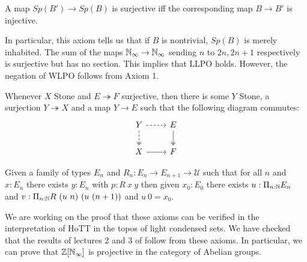 \begin{axiom}
  A map $Sp(B')\to Sp(B)$ is surjective iff the corresponding map $B \to B'$ is injective.
\end{axiom} 
In particular, this axiom tells us that if $B$ is nontrivial, 
$Sp(B)$ is merely inhabited.
%
%
The sum of the maps
$\mathbb{N}_{\infty} \to \mathbb{N}_{\infty}$
sending $n$ to $2n,2n+1$ respectively
is surjective but has no section. 
This implies that LLPO holds. 
However, the negation of WLPO follows from Axiom 1.  


\begin{axiom}
  Whenever $X$ Stone and $E\twoheadrightarrow F$ surjective, then there is some $Y$ Stone,
    a surjection $Y \twoheadrightarrow X$ and a map $Y\to E$ such that the following diagram commutes:
    \begin{equation*}\begin{tikzcd}
      Y \arrow [d, two heads,dashed] \arrow [r,dashed] & E \arrow[d,""',two heads]\\
      X \arrow[r] & F
    \end{tikzcd}\end{equation*}  
\end{axiom} 

\begin{axiom}
  Given a family of types $E_n$ and $R_n:E_n\rightarrow E_{n+1}\rightarrow {\mathcal U}$ such that
  for all $n$ and $x:E_n$ there exists $y:E_n$ with $p:R~x~y$ then given $x_0:E_0$ there exists
  $u:\Pi_{n:\mathbb{N}}E_n$ and $v:\Pi_{n:\mathbb{N}}R~(u~n)~(u~(n+1))$ and $u~0 = x_0$.
\end{axiom}

We are working on the proof that these axioms can be verified in the interpretation of HoTT in the topos of light condensed sets. We have checked that the results of lectures 2 and 3 of \cite{Scholze} follow from these axioms. 
In particular, we can prove that $\mathbb{Z}[\mathbb{N}_{\infty}]$ is projective in the category of Abelian groups. 
